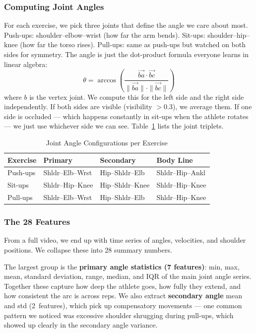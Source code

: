 \documentclass[conference]{IEEEtran}
\begin{document}
\subsubsection{Computing Joint Angles}
For each exercise, we pick three joints that define the angle we care about most. Push-ups: shoulder--elbow--wrist (how far the arm bends). Sit-ups: shoulder--hip--knee (how far the torso rises). Pull-ups: same as push-ups but watched on both sides for symmetry. The angle is just the dot-product formula everyone learns in linear algebra:
\begin{equation}
\theta = \arccos\!\left(\frac{\vec{ba} \cdot \vec{bc}}{\|\vec{ba}\| \cdot \|\vec{bc}\|}\right)
\label{eq:angle}
\end{equation}
where $b$ is the vertex joint. We compute this for the left side and the right side independently. If both sides are visible (visibility $> 0.3$), we average them. If one side is occluded --- which happens constantly in sit-ups when the athlete rotates --- we just use whichever side we can see. Table~\ref{tab:joints} lists the joint triplets.

\begin{table}[ht]
\caption{Joint Angle Configurations per Exercise}
\label{tab:joints}
\centering
\renewcommand{\arraystretch}{1.15}
\begin{tabular}{@{}llll@{}}
\toprule
\textbf{Exercise} & \textbf{Primary} & \textbf{Secondary} & \textbf{Body Line} \\
\midrule
Push-ups & Shldr--Elb--Wrst & Hip--Shldr--Elb & Shldr--Hip--Ankl \\
Sit-ups  & Shldr--Hip--Knee & Hip--Shldr--Knee & Shldr--Hip--Knee \\
Pull-ups & Shldr--Elb--Wrst & Hip--Shldr--Elb & Shldr--Hip--Knee \\
\bottomrule
\end{tabular}
\end{table}

\subsubsection{The 28 Features}
From a full video, we end up with time series of angles, velocities, and shoulder positions. We collapse these into 28 summary numbers.

The largest group is the \textbf{primary angle statistics (7 features)}: min, max, mean, standard deviation, range, median, and IQR of the main joint angle series. Together these capture how deep the athlete goes, how fully they extend, and how consistent the arc is across reps. We also extract \textbf{secondary angle} mean and std (2~features), which pick up compensatory movements --- one common pattern we noticed was excessive shoulder shrugging during pull-ups, which showed up clearly in the secondary angle variance.
\end{document}
